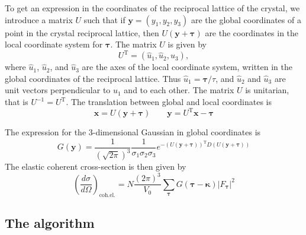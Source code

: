 To get an expression in the coordinates of the reciprocal lattice of the
crystal, we introduce a matrix $U$ such that if $\boldsymbol{y} =
(y_1,y_2,y_3)$ are the global coordinates of a point in the crystal
reciprocal lattice, then $U(\boldsymbol{y} + \boldsymbol{\tau})$ are the
coordinates in the local coordinate system for $\boldsymbol{\tau}$. The
matrix $U$ is given by
$$ U^\textrm{T} = (\hat{u}_1, \hat{u}_2, \hat{u}_3), $$
where $\hat{u}_1$, $\hat{u}_2$, and $\hat{u}_3$ are the axes of the
local coordinate system, written in the global coordinates of the
reciprocal lattice. Thus
$\hat{u}_1 = \boldsymbol{\tau}/\tau$,  and $\hat{u}_2$ and $\hat{u}_3$ are
unit vectors perpendicular to $\hat{u}_1$ and to each other.
The matrix $U$ is unitarian, that is
$U^{-1} = U^\textrm{T}$. The translation between global and local
coordinates is
$$ \boldsymbol{x} = U(\boldsymbol{y} + \boldsymbol{\tau}) \qquad
   \boldsymbol{y} = U^\textrm{T} \boldsymbol{x} - \boldsymbol{\tau} $$

The expression for the 3-dimensional Gaussian in global coordinates is
\begin{equation}
  G(\boldsymbol{y}) =
  \frac{1}{(\sqrt{2\pi})^3}\frac{1}{\sigma_1\sigma_2\sigma_3}
  e^{-(U(\boldsymbol{y}+\boldsymbol{\tau}))^\textrm{T} D (U(\boldsymbol{y}+\boldsymbol{\tau}))}
\end{equation}
The elastic coherent cross-section is then given by
\begin{equation}
  \label{eq:crystal-cross-section}
  \left(\frac{d\sigma}{d\Omega}\right)_\textrm{coh.el.} =
        N\frac{(2\pi)^3}{V_0}\sum_{\boldsymbol{\tau}}
        G(\boldsymbol{\tau} - \boldsymbol{\kappa})
         |F_{\boldsymbol{\tau}}|^2
\end{equation}

\subsection{The algorithm}

